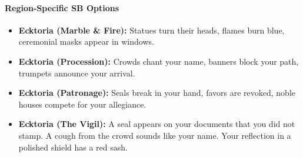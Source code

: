 \paragraph{Region-Specific SB Options}
\begin{itemize}
\item \textbf{Ecktoria (Marble \& Fire):} Statues turn their heads, flames burn blue, ceremonial masks appear in windows.
\item \textbf{Ecktoria (Procession):} Crowds chant your name, banners block your path, trumpets announce your arrival.
\item \textbf{Ecktoria (Patronage):} Seals break in your hand, favors are revoked, noble houses compete for your allegiance.
\item \textbf{Ecktoria (The Vigil):} A seal appears on your documents that you did not stamp. A cough from the crowd sounds like your name. Your reflection in a polished shield has a red sash.
\end{itemize}

